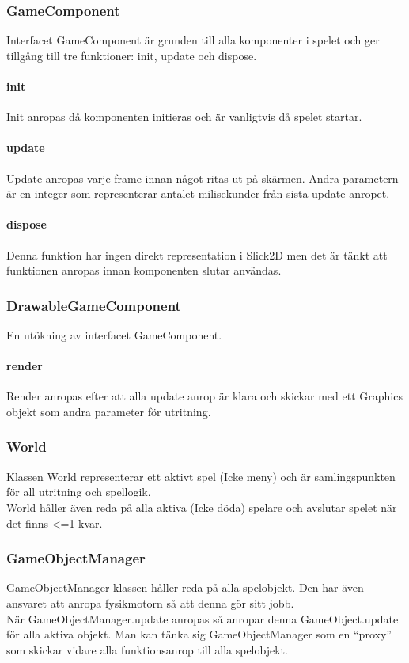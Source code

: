 \subsubsection{GameComponent}
Interfacet GameComponent är grunden till alla komponenter i spelet och ger tillgång till tre funktioner: init, update och dispose.\\
\paragraph{init}
Init anropas då komponenten initieras och är vanligtvis då spelet startar.\\
\paragraph{update}
Update anropas varje frame innan något ritas ut på skärmen. Andra parametern är en integer som representerar antalet milisekunder från sista update anropet.\\
\paragraph{dispose}
Denna funktion har ingen direkt representation i Slick2D men det är tänkt att funktionen anropas innan komponenten slutar användas.\\
\subsubsection{DrawableGameComponent}
En utökning av interfacet GameComponent.
\paragraph{render}
Render anropas efter att alla update anrop är klara och skickar med ett Graphics objekt som andra parameter för utritning.\\
\subsubsection{World}
Klassen World representerar ett aktivt spel (Icke meny) och är samlingspunkten för all utritning och spellogik.\\
World håller även reda på alla aktiva (Icke döda) spelare och avslutar spelet när det finns <=1 kvar.\\
\subsubsection{GameObjectManager}
GameObjectManager klassen håller reda på alla spelobjekt. Den har även ansvaret att anropa fysikmotorn så att denna gör sitt jobb.\\
När GameObjectManager.update anropas så anropar denna GameObject.update för alla aktiva objekt. Man kan tänka sig GameObjectManager som en ``proxy'' som skickar vidare alla funktionsanrop till alla spelobjekt.\\
